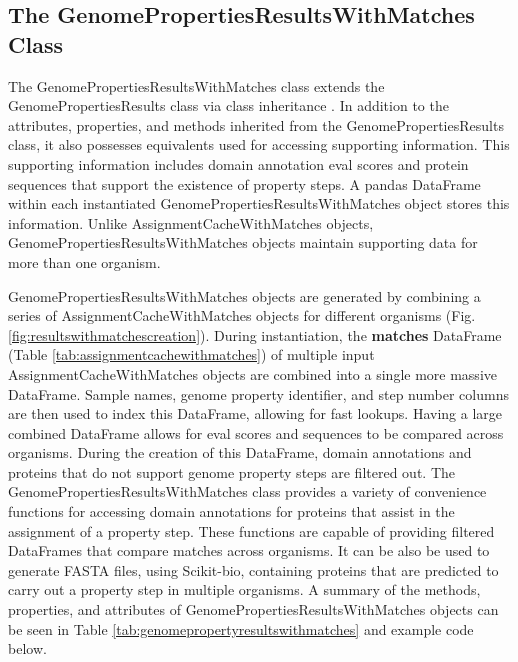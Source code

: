 \pagebreak

\subsection{The GenomePropertiesResultsWithMatches Class} \label{PropertyResultsWithMatches}

The GenomePropertiesResultsWithMatches class extends the GenomePropertiesResults class via class inheritance \cite{snyder1986encapsulation}. In addition to the attributes, properties, and methods inherited from the GenomePropertiesResults class, it also possesses equivalents used for accessing supporting information. This supporting information includes domain annotation \gls{eval} scores and protein sequences that support the existence of property steps. A pandas DataFrame within each instantiated GenomePropertiesResultsWithMatches object stores this information. Unlike AssignmentCacheWithMatches objects, GenomePropertiesResultsWithMatches objects maintain supporting data for more than one organism.

GenomePropertiesResultsWithMatches objects are generated by combining a series of AssignmentCacheWithMatches objects for different organisms (Fig. \ref{fig:resultswithmatchescreation}). During instantiation, the \textbf{matches} DataFrame (Table \ref{tab:assignmentcachewithmatches}) of multiple input AssignmentCacheWithMatches objects are combined into a single more massive DataFrame. Sample names, genome property identifier, and step number columns are then used to index this DataFrame, allowing for fast lookups. Having a large combined DataFrame allows for \gls{eval} scores and sequences to be compared across organisms. During the creation of this DataFrame, domain annotations and proteins that do not support genome property steps are filtered out. The GenomePropertiesResultsWithMatches class provides a variety of convenience functions for accessing domain annotations for proteins that assist in the assignment of a property step. These functions are capable of providing filtered DataFrames that compare matches across organisms. It can be also be used to generate FASTA files, using Scikit-bio, containing proteins that are predicted to carry out a property step in multiple organisms. A summary of the methods, properties, and attributes of GenomePropertiesResultsWithMatches objects can be seen in Table \ref{tab:genomepropertyresultswithmatches} and example code below. 

